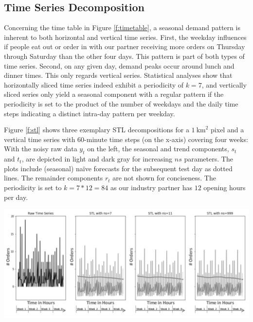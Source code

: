 \subsection{Time Series Decomposition}
\label{decomp}

Concerning the time table in Figure \ref{f:timetable}, a seasonal demand
    pattern is inherent to both horizontal and vertical time series.
First, the weekday influences if people eat out or order in with our partner
    receiving more orders on Thursday through Saturday than the other four
    days.
This pattern is part of both types of time series.
Second, on any given day, demand peaks occur around lunch and dinner times.
This only regards vertical series.
Statistical analyses show that horizontally sliced time series indeed exhibit
    a periodicity of $k=7$, and vertically sliced series only yield a seasonal
    component with a regular pattern if the periodicity is set to the product
    of the number of weekdays and the daily time steps indicating a distinct
    intra-day pattern per weekday.

Figure \ref{f:stl} shows three exemplary STL decompositions for a
    $1~\text{km}^2$ pixel and a vertical time series with 60-minute time steps
    (on the x-axis) covering four weeks:
With the noisy raw data $y_t$ on the left, the seasonal and trend components,
    $s_t$ and $t_t$, are depicted in light and dark gray for increasing $ns$
    parameters.
The plots include (seasonal) na\"{i}ve forecasts for the subsequent test day
    as dotted lines.
The remainder components $r_t$ are not shown for conciseness.
The periodicity is set to $k = 7 * 12 = 84$ as our industry partner has $12$
    opening hours per day.

\begin{center}
\label{f:stl}
\includegraphics[width=.95\linewidth]{static/stl_gray.png}
\end{center}

